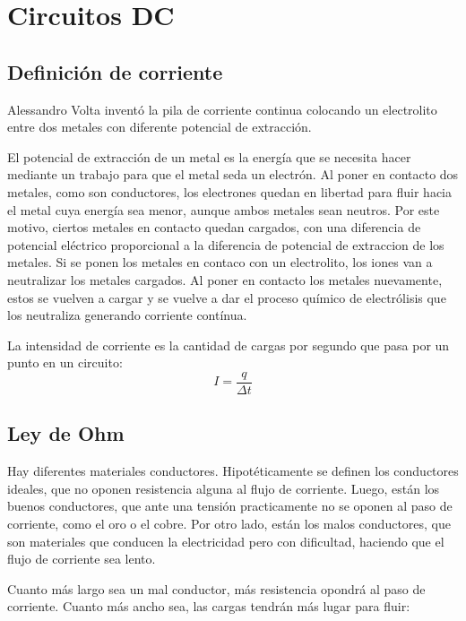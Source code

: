 \documentclass[a5paper,12pt,twoside]{book}
\begin{document}
\chapter{Circuitos DC}


\section{Definición de corriente}

Alessandro Volta inventó la pila de corriente continua colocando un electrolito entre dos metales con diferente potencial de extracción.

El potencial de extracción de un metal es la energía que se necesita hacer mediante un trabajo para que el metal seda un electrón. Al poner en contacto dos metales, como son conductores, los electrones quedan en libertad para fluir hacia el metal cuya energía sea menor, aunque ambos metales sean neutros. Por este motivo, ciertos metales en contacto quedan cargados, con una diferencia de potencial eléctrico proporcional a la diferencia de potencial de extraccion de los metales. Si se ponen los metales en contaco con un electrolito, los iones van a neutralizar los metales cargados. Al poner en contacto los metales nuevamente, estos se vuelven a cargar y se vuelve a dar el proceso químico de electrólisis que los neutraliza generando corriente contínua.

La intensidad de corriente es la cantidad de cargas por segundo que pasa por un punto en un circuito:
\begin{equation*}
    I = \frac{q}{\Delta t}
\end{equation*}


\section{Ley de Ohm}

Hay diferentes materiales conductores. Hipotéticamente se definen los conductores ideales, que no oponen resistencia alguna al flujo de corriente. Luego, están los buenos conductores, que ante una tensión practicamente no se oponen al paso de corriente, como el oro o el cobre. Por otro lado, están los malos conductores, que son materiales que conducen la electricidad pero con dificultad, haciendo que el flujo de corriente sea lento.

Cuanto más largo sea un mal conductor, más resistencia opondrá al paso de corriente. Cuanto más ancho sea, las cargas tendrán más lugar para fluir:
\end{document}
